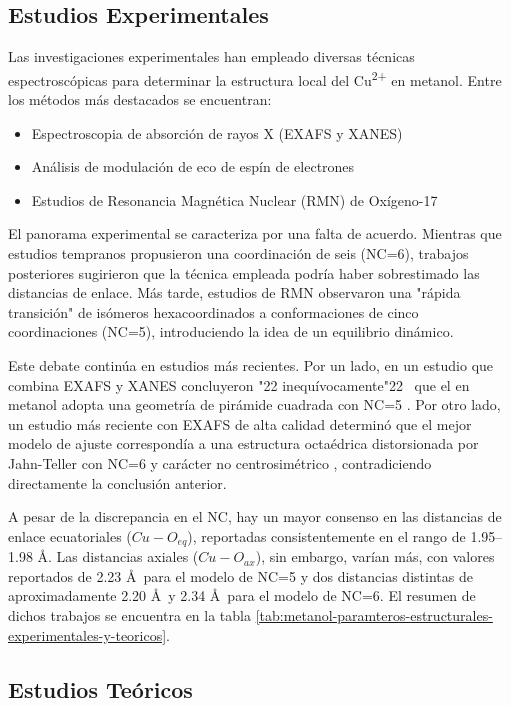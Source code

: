 \subsection*{Estudios Experimentales}

Las investigaciones experimentales han empleado diversas técnicas espectroscópicas para determinar la estructura local del Cu\textsuperscript{2+} en metanol. Entre los métodos más destacados se encuentran:
\begin{itemize}
    \item Espectroscopia de absorción de rayos X (EXAFS y XANES)
    \item Análisis de modulación de eco de espín de electrones
    \item Estudios de Resonancia Magnética Nuclear (RMN) de Oxígeno-17
\end{itemize}

El panorama experimental se caracteriza por una falta de acuerdo. Mientras que estudios tempranos \cite{Me-1980-01} propusieron una coordinación de seis (NC=6), trabajos posteriores sugirieron que la técnica empleada podría haber sobrestimado las distancias de enlace. Más tarde, estudios de RMN \cite{Me-1986-01} observaron una "rápida transición" de isómeros hexacoordinados a conformaciones de cinco coordinaciones (NC=5), introduciendo la idea de un equilibrio dinámico.

Este debate continúa en estudios más recientes. Por un lado, en un estudio que combina EXAFS y XANES concluyeron \char"22 inequívocamente\char"22 \ que el  en metanol adopta una geometría de pirámide cuadrada con NC=5 \cite{Me-2012-01}. Por otro lado, un estudio más reciente con EXAFS de alta calidad determinó que el mejor modelo de ajuste correspondía a una estructura octaédrica distorsionada por Jahn-Teller con NC=6 y carácter no centrosimétrico \cite{Wa-2020-01}, contradiciendo directamente la conclusión anterior.

A pesar de la discrepancia en el NC, hay un mayor consenso en las distancias de enlace ecuatoriales ($Cu-O_{eq}$), reportadas consistentemente en el rango de 1.95--1.98 \AA. Las distancias axiales ($Cu-O_{ax}$), sin embargo, varían más, con valores reportados de 2.23 \AA \ para el modelo de NC=5 y dos distancias distintas de aproximadamente 2.20 \AA \ y 2.34 \AA \ para el modelo de NC=6. El resumen de dichos trabajos se encuentra en la tabla \ref{tab:metanol-paramteros-estructurales-experimentales-y-teoricos}.

\subsection*{Estudios Teóricos}

